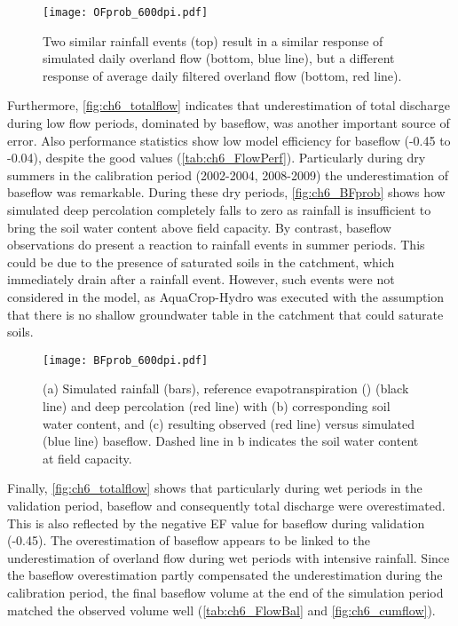  \begin{figure}[tbhp]
	\centering
		\texttt{[image: OFprob\_600dpi.pdf]}
	\caption{Two similar rainfall events (top) result in a similar response of simulated daily overland flow (bottom, blue line), but a different response of average daily filtered overland flow (bottom, red line). }
	\label{fig:ch6_OFprob}
\end{figure} 

Furthermore, \autoref{fig:ch6_totalflow} indicates that underestimation of total discharge during low flow periods, dominated by baseflow, was another important source of error. Also performance statistics show low model efficiency for baseflow (-0.45 to -0.04), despite the good \Rsq values (\autoref{tab:ch6_FlowPerf}). Particularly during dry summers in the calibration period (2002-2004, 2008-2009) the underestimation of baseflow was remarkable. During these dry periods, \autoref{fig:ch6_BFprob} shows how simulated deep percolation completely falls to zero as rainfall is insufficient to bring the soil water content above field capacity. By contrast, baseflow observations do present a reaction to rainfall events in summer periods. This could be due to the presence of saturated soils in the catchment, which immediately drain after a rainfall event. However, such events were not considered in the model, as AquaCrop-Hydro was executed with the assumption that there is no shallow groundwater table in the catchment that could saturate soils.

 \begin{figure}[tbhp]
	\centering
		\texttt{[image: BFprob\_600dpi.pdf]}
	\caption{(a) Simulated rainfall (bars), reference evapotranspiration (\ETo) (black line) and deep percolation (red line) with (b) corresponding soil water content, and (c) resulting observed (red line) versus simulated (blue line) baseflow. Dashed line in b indicates the soil water content at field capacity. }
	\label{fig:ch6_BFprob}
\end{figure}  

Finally, \autoref{fig:ch6_totalflow} shows that particularly during wet periods in the validation period, baseflow and consequently total discharge were overestimated. This is also reflected by the negative EF value for baseflow during validation (-0.45). The overestimation of baseflow appears to be linked to the underestimation of overland flow during wet periods with intensive rainfall. Since the baseflow overestimation partly compensated the underestimation during the calibration period, the final baseflow volume at the end of the simulation period matched the observed volume well (\autoref{tab:ch6_FlowBal} and \autoref{fig:ch6_cumflow}). 

